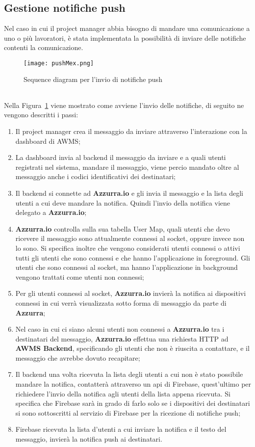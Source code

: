 \subsection{Gestione notifiche push}
Nel caso in cui il project manager abbia bisogno di mandare una comunicazione a uno o più lavoratori, è stata implementata la possibilità di inviare delle notifiche contenti la comunicazione.
\begin{figure}[h]
	\begin{center}
		\texttt{[image: pushMex.png]}
		\caption{Sequence diagram per l'invio di notifiche push}\label{fig:push}
	\end{center}
\end{figure}\\
Nella Figura~\ref{fig:push} viene mostrato come avviene l'invio delle notifiche, di seguito ne vengono descritti i passi:
\begin{enumerate}
	\item Il project manager crea il messaggio da inviare attraverso l'interazione con la dashboard di AWMS;
	\item La dashboard invia al backend il messaggio da inviare e a quali utenti registrati nel sistema, mandare il messaggio, viene percio mandato oltre al messaggio anche i codici identificativi dei destinatari;
	\item Il backend si connette ad \textbf{Azzurra.io} e gli invia il messaggio e la lista degli utenti a cui deve mandare la notifica. Quindi l'invio della notifica viene delegato a \textbf{Azzurra.io}; 
	\item \textbf{Azzurra.io} controlla sulla sua tabella User Map, quali utenti che devo ricevere il messaggio sono attualmente connessi al socket, oppure invece non lo sono. Si specifica inoltre che vengono considerati utenti connessi o attivi tutti gli utenti che sono connessi e che hanno l’applicazione in foreground. Gli utenti che sono connessi al socket, ma hanno l’applicazione in background vengono trattati come utenti non connessi;
	\item Per gli utenti connessi al socket, \textbf{Azzurra.io} invierà la notifica ai dispositivi connessi in cui verrà visualizzata sotto forma di messaggio da parte di \textbf{Azzurra};
	\item Nel caso in cui ci siano alcuni utenti non connessi a \textbf{Azzurra.io} tra i destinatari del messaggio, \textbf{Azzurra.io} effettua una richiesta HTTP ad \textbf{AWMS Backend}, specificando gli utenti che non è riuscita a contattare, e il messaggio che avrebbe dovuto recapitare;
	\item Il backend una volta ricevuta la lista degli utenti a cui non è stato possibile mandare la notifica, contatterà attraverso un \gls{api} di Firebase, quest'ultimo per richiedere l'invio della notifica agli utenti della lista appena ricevuta. Si specifica che Firebase sarà in grado di farlo solo se i dispositivi dei destinatari si sono sottoscritti al servizio di Firebase per la ricezione di notifiche push;
	\item Firebase ricevuta la lista d'utenti a cui inviare la notifica e il testo del messaggio, invierà la notifica push ai destinatari.
\end{enumerate}